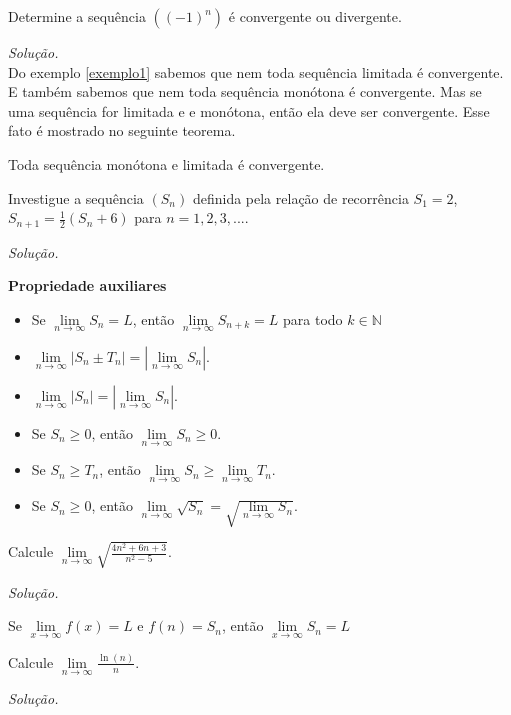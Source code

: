 \begin{ex}\label{exemplo1}
	Determine a sequência $\left( (-1)^{n}\right) $ é convergente ou divergente.
\end{ex}
\textit{Solução.}
\vspace*{2.5cm}
\\

Do exemplo \ref{exemplo1} sabemos que nem toda sequência limitada é convergente. E também sabemos que nem toda sequência monótona é convergente. Mas se uma sequência for limitada e e monótona, então ela deve ser convergente. Esse fato é mostrado no seguinte teorema.
\begin{teo} 
	Toda sequência monótona e limitada é convergente.
\end{teo}
\begin{ex}
	Investigue a sequência $\left( S_{n}\right) $ definida pela relação de recorrência $S_{1}=2$, $S_{n+1}=\frac{1}{2}(S_{n}+6)$ para $n=1,2,3,...$.
\end{ex}
\textit{Solução.}
\vspace*{10cm}

\newpage
\textbf{Propriedade auxiliares}
\begin{itemize}
	\item Se  $\lim\limits_{n\longrightarrow \infty} S_{n}=L$, então $\lim\limits_{n\longrightarrow \infty} S_{n+k}=L$ para todo $k\in \mathbb{N} $

	\item $\lim\limits_{n\longrightarrow \infty} \left|  S_{n}\pm T_{n}\right|  =\left| \lim\limits_{n\longrightarrow \infty}  S_{n}\right| $.

	\item $\lim\limits_{n\longrightarrow \infty} \left|  S_{n}\right|  =\left| \lim\limits_{n\longrightarrow \infty}  S_{n}\right| $.

	\item Se $S_{n}\geq 0$, então $\lim\limits_{n\longrightarrow \infty} S_{n} \geq 0$.
	\item Se $S_{n}\geq T_{n}$, então $\lim\limits_{n\longrightarrow \infty} S_{n} \geq \lim\limits_{n\longrightarrow \infty}T_{n}$.
	\item Se $S_{n}\geq 0$, então $\lim\limits_{n\longrightarrow \infty} \sqrt{S_{n}} =\sqrt{\lim\limits_{n\longrightarrow \infty} S_{n} }$.
\end{itemize}
\begin{ex}
	Calcule $\lim\limits_{n\longrightarrow \infty}\sqrt{\frac{4n^{2}+6n+3}{n^{2}-5}} $.
\end{ex}
\textit{Solução.}
\vspace*{5cm}
\begin{teo} 
	Se $\lim\limits_{x\longrightarrow \infty} f(x)=L$ e $f(n)=S_{n}$, então $\lim\limits_{x\longrightarrow \infty} S_{n}=L$
\end{teo}
\begin{ex}
	Calcule $\lim\limits_{n\longrightarrow \infty}\frac{\ln (n)}{n} $.
\end{ex}
\textit{Solução.}
\vspace*{5cm}

